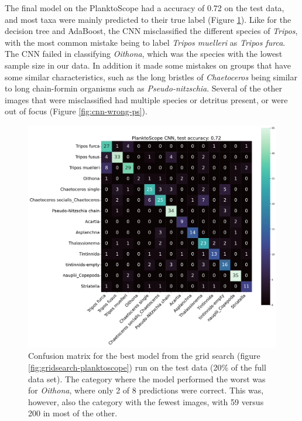 The final model on the PlanktoScope had a accuracy of 0.72 on the test data, and most taxa were mainly predicted to their true label (Figure \ref{fig:confusion-planktoscope}). Like for the decision tree and AdaBoost, the CNN misclassified the different species of \textit{Tripos}, with the most common mistake being to label \textit{Tripos muelleri} as \textit{Tripos furca}. The CNN failed in classifying \textit{Oithona}, which was the species with the lowest sample size in our data. In addition it made some mistakes on groups that have some similar characteristics, such as the long bristles of \textit{Chaetoceros} being similar to long chain-formin organisms such as \textit{Pseudo-nitzschia}. Several of the other images that were misclassified had multiple species or detritus present, or were out of focus (Figure \ref{fig:cnn-wrong-ps}).

\begin{figure}
    \centering
    \includegraphics[width=\linewidth]{examples/tests_even/figs/confusion-matrix-2024-12-06_1241.pdf}
    \caption{Confusion matrix for the best model from the grid search (figure \ref{fig:gridsearch-planktoscope}) run on the test data (20\% of the full data set). The category where the model performed the worst was for \textit{Oithona}, where only 2 of 8 predictions were correct. This was, however, also the category with the fewest images, with 59 versus 200 in most of the other.}
    \label{fig:confusion-planktoscope}
\end{figure}

